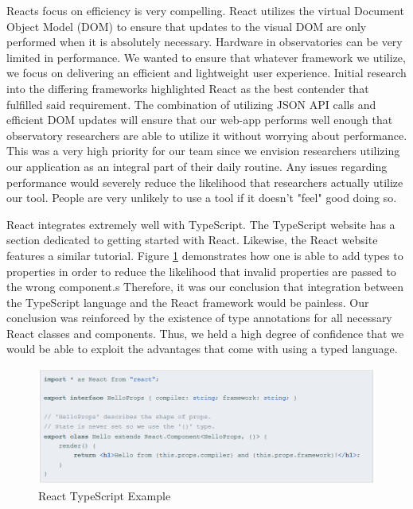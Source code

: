 \documentclass[12pt]{article}
\begin{document}
Reacts focus on efficiency is very compelling. React utilizes the virtual Document Object Model (DOM) to ensure that updates to the visual DOM are only performed when it is absolutely necessary. Hardware in observatories can be very limited in performance. We wanted to ensure that whatever framework we utilize, we focus on delivering an efficient and lightweight user experience. Initial research into the differing frameworks highlighted React as the best contender that fulfilled said requirement. The combination of utilizing JSON API calls and efficient DOM updates will ensure that our web-app performs well enough that observatory researchers are able to utilize it without worrying about performance. This was a very high priority for our team since we envision researchers utilizing our application as an integral part of their daily routine. Any issues regarding performance would severely reduce the likelihood that researchers actually utilize our tool. People are very unlikely to use a tool if it doesn't "feel" good doing so.

React integrates extremely well with TypeScript. The TypeScript website has a section dedicated to getting started with React.\cite{typescriptreacttutorial} Likewise, the React website features a similar tutorial.\cite{reacttypescripttutorial} Figure \ref{fig:reacttypescriptexample} demonstrates how one is able to add types to properties in order to reduce the likelihood that invalid properties are passed to the wrong component.s Therefore, it was our conclusion that integration between the TypeScript language and the React framework would be painless. Our conclusion was reinforced by the existence of type annotations for all necessary React classes and components. Thus, we held a high degree of confidence that we would be able to exploit the advantages that come with using a typed language.

\begin{figure}[h]
	\centering
	\includegraphics[scale=0.5]{react_typescript_example}
	\caption{React TypeScript Example}
	\label{fig:reacttypescriptexample}
\end{figure}
\end{document}
